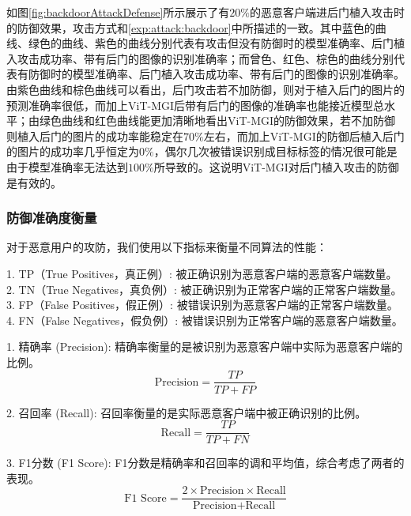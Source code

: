 \documentclass[conference]{IEEEtran}
\begin{document}
如图\hyperref[fig:backdoorAttackDefense]{\ref{fig:backdoorAttackDefense}}所示展示了有$20\%$的恶意客户端进后门植入攻击时的防御效果，攻击方式和\hyperref[exp:attack:backdoor]{\ref{exp:attack:backdoor}}中所描述的一致。其中蓝色的曲线、绿色的曲线、紫色的曲线分别代表有攻击但没有防御时的模型准确率、后门植入攻击成功率、带有后门的图像的识别准确率；而曾色、红色、棕色的曲线分别代表有防御时的模型准确率、后门植入攻击成功率、带有后门的图像的识别准确率。由紫色曲线和棕色曲线可以看出，后门攻击若不加防御，则对于植入后门的图片的预测准确率很低，而加上ViT-MGI后带有后门的图像的准确率也能接近模型总水平；由绿色曲线和红色曲线能更加清晰地看出ViT-MGI的防御效果，若不加防御则植入后门的图片的成功率能稳定在$70\%$左右，而加上ViT-MGI的防御后植入后门的图片的成功率几乎恒定为$0\%$，偶尔几次被错误识别成目标标签的情况很可能是由于模型准确率无法达到$100\%$所导致的。这说明ViT-MGI对后门植入攻击的防御是有效的。

\subsubsection{\textbf{防御准确度衡量}}
\label{exp:defense_accuracy}

对于恶意用户的攻防，我们使用以下指标来衡量不同算法的性能：

1. TP（True Positives，真正例）: 被正确识别为恶意客户端的恶意客户端数量。
2. TN（True Negatives，真负例）: 被正确识别为正常客户端的正常客户端数量。
3. FP（False Positives，假正例）: 被错误识别为恶意客户端的正常客户端数量。
4. FN（False Negatives，假负例）: 被错误识别为正常客户端的恶意客户端数量。

1. 精确率 (Precision): 精确率衡量的是被识别为恶意客户端中实际为恶意客户端的比例。
    \[
    \text{Precision} = \frac{TP}{TP + FP}
    \]

2. 召回率 (Recall): 召回率衡量的是实际恶意客户端中被正确识别的比例。
    \[
    \text{Recall} = \frac{TP}{TP + FN}
    \]

3. F1分数 (F1 Score): F1分数是精确率和召回率的调和平均值，综合考虑了两者的表现。
    \[
    \text{F1 Score} = \frac{2 \times \text{Precision} \times \text{Recall}}{\text{Precision} + \text{Recall}}
    \]


\end{document}
